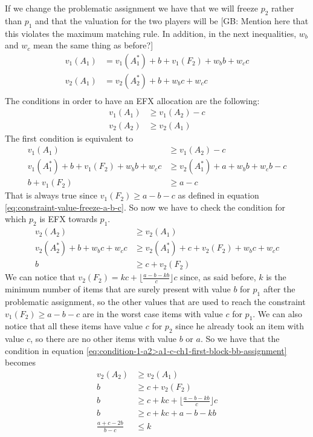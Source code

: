 \documentclass{article}
\newcommand{\gb}[1]{{\color{red}[GB: #1]}}
\begin{document}
If we change the problematic assignment we have that we will freeze $p_2$ rather than $p_1$ and that the valuation for the two players will be 
\gb{Mention here that this violates the maximum matching rule. In addition, in the next inequalities, $w_b$ and $w_c$ mean the same thing as before?}
\begin{align}
    v_1(A_1) &= v_1(A_1^*) + b + v_1(F_2) + w_b b + w_c c\\
    v_2(A_1) &= v_2(A_2^*) + b + w_b c + w_c c\\
\end{align}
The conditions in order to have an EFX allocation are the following: 
\begin{align}
    v_1(A_1) &\ge v_1(A_2) - c\label{eq:condition-1-a1>a2-ch1-first-block-bb-assignment}\\
    v_2(A_2) &\ge v_2(A_1)\label{eq:condition-1-a2>a1-c-ch1-first-block-bb-assignment}
\end{align}
The first condition is equivalent to 
\begin{align*}
    v_1(A_1) &\ge v_1(A_2) -c\\
    v_1(A_1^*) + b + v_1(F_2)+ w_b b + w_c c &\ge v_2(A_1^*) + a + w_b b + w_c b - c\\
    b  + v_1(F_2)&\ge  a - c 
\end{align*}
That is always true since $ v_1(F_2) \ge  a-b-c$ as defined in equation \ref{eq:constraint-value-freeze-a-b-c}. So now we have to check the condition for which $p_2$ is EFX towards $p_1$.
\begin{align}
    v_2(A_2) &\ge v_2(A_1)\\
    v_2(A_2^*) + b + w_b c + w_c c &\ge  v_2(A_1^*) + c + v_2(F_2)+ w_b c + w_c c\\
    b  &\ge  c + v_2(F_2)
\end{align}
We can notice that $v_2(F_2) = kc + \lfloor \frac{a-b-kb}{c} \rfloor c$ since, as said before, $k$ is the minimum number of items that are surely present with value $b$ for $p_1$ after the problematic assignment, so the other values that are used to reach the constraint $v_1(F_2) \ge a-b-c$ are in the worst case items with value $c$ for $p_1$. We can also notice that all these items have value $c$ for $p_2$ since he already took an item with value $c$, so there are no other items with value $b$ or $a$. So we have that the condition in equation \ref{eq:condition-1-a2>a1-c-ch1-first-block-bb-assignment} becomes
\begin{align}
    v_2(A_2) &\ge v_2(A_1)\\
     b  &\ge  c + v_2(F_2)\\
      b  &\ge  c +  kc + \lfloor \frac{a-b-kb}{c} \rfloor c\\
      b  &\ge  c +  kc + a-b-kb\\
      \frac{a + c -2b}{b-c}  &\le   k
\end{align}
\end{document}
